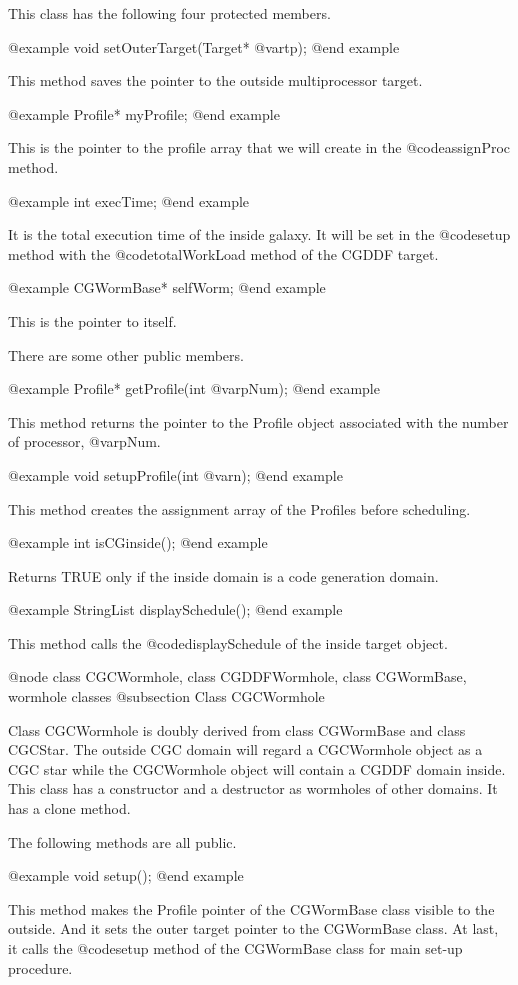 {This class has the following four protected members.

@example
void setOuterTarget(Target* @var{tp});
@end example

This method saves the pointer to the outside multiprocessor target.

@example
Profile* myProfile;
@end example

This is the pointer to the profile array that we will create 
in the @code{assignProc} method.

@example
int execTime;
@end example

It is the total execution time of the inside galaxy. It will be set in the
@code{setup} method with the @code{totalWorkLoad} method of the CGDDF target.

@example
CGWormBase* selfWorm;
@end example

This is the pointer to itself.

There are some other public members.

@example
Profile* getProfile(int @var{pNum});
@end example

This method returns the pointer to the Profile object associated with
the number of processor, @var{pNum}.

@example
void setupProfile(int @var{n});
@end example

This method creates the assignment array of the Profiles before scheduling.

@example
int isCGinside();
@end example

Returns TRUE only if the inside domain is a code generation domain.

@example
StringList displaySchedule();
@end example

This method calls the @code{displaySchedule} of the inside target object.

@node class CGCWormhole, class CGDDFWormhole, class CGWormBase, wormhole classes
@subsection Class CGCWormhole

Class CGCWormhole is doubly derived from class CGWormBase and class CGCStar.
The outside CGC domain will regard a CGCWormhole object as a CGC star while
the CGCWormhole object will contain a CGDDF domain inside. This class has
a constructor and a destructor as wormholes of other domains. It has a clone
method.

The following methods are all public.

@example
void setup();
@end example

This method makes the Profile pointer of the CGWormBase class visible to
the outside. And it sets the outer target pointer to the CGWormBase class.
At last, it calls the @code{setup} method of the CGWormBase class for
main set-up procedure.

}
